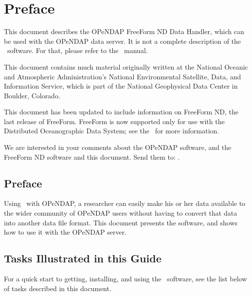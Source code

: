 %
%

\T\chapter*{Preface}
\T{}

This document describes the OPeNDAP FreeForm ND Data Handler, which
can be used with the OPeNDAP data server.  It is not a
complete description of the \ffnd\ software.  For that, please refer
to the \ffnd\ manual.

This document contains much material originally written at the
National Oceanic and Atmospheric Administration's National
Environmental Satellite, Data, and Information Service, which is part
of the National Geophysical Data Center in Boulder, Colorado.

This document has been updated to include information on FreeForm ND,
the last release of FreeForm. FreeForm is now supported only for use
with the Distributed Oceanographic Data System; see the 
\DODShome\ for more information.

We are interested in your comments about the OPeNDAP software, and the
FreeForm ND software and this document.  Send them to:
.

\begin{ifhtml}
  \chapter*{Preface}
\end{ifhtml}

Using \ffnd\ with OPeNDAP, a researcher can easily make his or her data
available to the wider community of OPeNDAP users without having to
convert that data into another data file format.  This document
presents the \ffnd software, and shows how to use it with the OPeNDAP server.

\section{Tasks Illustrated in this Guide}
\label{pref,tasks}

For a quick start to getting, installing, and using the \ffnd\
software, see the list below of tasks described in this document.

